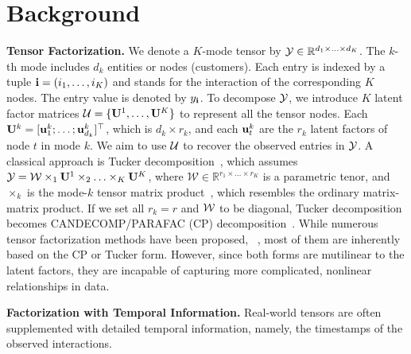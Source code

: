 \section{Background}
\textbf{Tensor Factorization.} We denote a $K$-mode tensor by $\mathcal{Y} \in \mathbb{R}^{d_1 \times \ldots \times d_K}$. The $k$-th mode includes $d_k$ entities or nodes (\eg customers).  Each entry is indexed by a tuple ${\bf i} = (i_1, \ldots, i_K)$ and stands for the interaction of the corresponding $K$ nodes.  The entry value is denoted by $y_{{\bf i}}$. To decompose $\mathcal{Y}$, we  introduce $K$ latent factor matrices ${\mathcal{U}} = \{{\bf U}^1, \ldots, {\bf U}^K\}$ to represent all the tensor nodes. Each ${\bf U}^k =[{\bf u}^k_1; \ldots ; {\bf u}^k_{d_k}]^\top$, which is $d_k \times r_k$, and each ${\bf u}^k_t$ are the $r_k$ latent factors of node $t$ in mode $k$. We aim to use ${\mathcal{U}}$ to recover the observed entries in $\mathcal{Y}$. A classical approach is Tucker decomposition~\citep{Tucker66}, which assumes $\mathcal{Y} = {\mathcal{W}} \times_1 {\bf U}^{1} \times_2 \ldots \times_K {\bf U}^{K}$, where  $\mathcal{W} \in \mathbb{R}^{r_1 \times \ldots \times r_K}$ is a parametric tenor,  and $\times_k$ is the mode-$k$ tensor matrix product~\citep{kolda2006multilinear}, which resembles the ordinary matrix-matrix product.
If we set all $r_k = r$ and ${\mathcal{W}}$ to be diagonal, Tucker decomposition becomes  CANDECOMP/PARAFAC (CP) decomposition~\citep{Harshman70parafac}. While numerous tensor factorization methods have  been proposed, \eg  ~\citep{Chu09ptucker,kang2012gigatensor,choi2014dfacto}, most of them are inherently based on the CP or Tucker form. However, since both forms are mutilinear to the latent factors, they are incapable of capturing more complicated, nonlinear relationships in data.

\textbf{Factorization with Temporal Information.} Real-world tensors are often supplemented with detailed temporal information, namely, the timestamps of the observed interactions.

